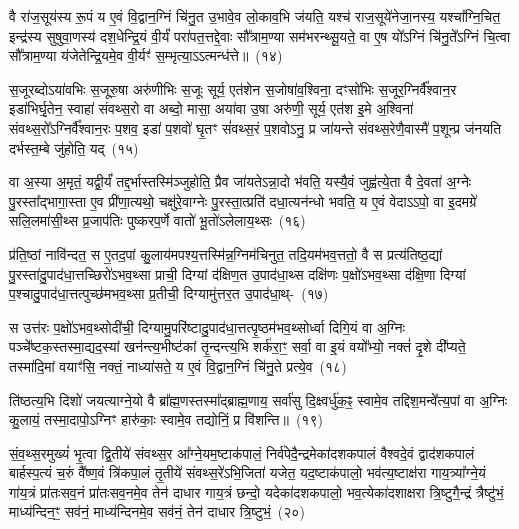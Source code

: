 वै रा॑ज॒सूय॑स्य रू॒पं य ए॒वं वि॒द्वान॒ग्निं चि॑नु॒त उ॒भावे॒व लो॒काव॒भि ज॑यति॒ यश्च॑ राज॒सूये॑नेजा॒नस्य॒ यश्चा᳚ग्नि॒चित॒ इन्द्र॑स्य सुषुवा॒णस्य॑ दश॒धेन्द्रि॒यं वी॒र्यं॑ परा॑पत॒त्तद्दे॒वाः सौ᳚त्राम॒ण्या सम॑भरन्थ्सू॒यते॒ वा ए॒ष यो᳚\-ऽग्निं चि॑नु॒ते᳚\-ऽग्निं चि॒त्वा सौ᳚त्राम॒ण्या य॑जेतेन्द्रि॒यमे॒व वी॒र्यꣳ॑ स॒म्भृत्या॒\-ऽऽत्मन्ध॑त्ते॥~(१४)\ip

{}

स॒जूरब्दो\-ऽया॑वभिः स॒जूरु॒षा अरु॑णीभिः स॒जूः सूर्य॒ एत॑शेन स॒जोषा॑व॒श्विना॒ दꣳसो॑भिः स॒जूर॒ग्निर्वै᳚श्वान॒र इडा॑भिर्घृ॒तेन॒ स्वाहा॑ संवथ्स॒रो वा अब्दो॒ मासा॒ अया॑वा उ॒षा अरु॑णी॒ सूर्य॒ एत॑श इ॒मे अ॒श्विना॑ संवथ्स॒रो᳚\-ऽग्निर्वै᳚श्वान॒रः प॒शव॒ इडा॑ प॒शवो॑ घृ॒तꣳ सं॑वथ्स॒रं प॒शवो\-ऽनु॒ प्र जा॑यन्ते संवथ्स॒रेणै॒वास्मै॑ प॒शून्प्र ज॑नयति दर्भस्त॒म्बे जु॑होति॒ यद्~(१५)\ip

वा अ॒स्या अ॒मृतं॒ यद्वी॒र्यं॑ तद्द॒र्भास्तस्मि॑ञ्जुहोति॒ प्रैव जा॑यते\-ऽन्ना॒दो भ॑वति॒ यस्यै॒वं जुह्व॑त्ये॒ता वै दे॒वता॑ अ॒ग्नेः पु॒रस्ता᳚द्भागा॒स्ता ए॒व प्री॑णा॒त्यथो॒ चक्षु॑रे॒वाग्नेः पु॒रस्ता॒त्प्रति॑ दधा॒त्यन॑न्धो भवति॒ य ए॒वं वेदाऽऽपो॒ वा इ॒दमग्रे॑ सलि॒लमा॑सी॒थ्स प्र॒जा\-प॑तिः पुष्करप॒र्णे वातो॑ भू॒तो॑\-ऽलेलाय॒थ्सः~(१६)\ip

प्र॑ति॒ष्ठां नावि॑न्दत॒ स ए॒तद॒पां कु॒लाय॑मपश्य॒त्तस्मि॑न्न॒ग्निम॑चिनुत॒ तदि॒यम॑भव॒त्ततो॒ वै स प्रत्य॑तिष्ठ॒द्यां पु॒रस्ता॑दु॒पा\-द॑धा॒त्तच्छिरो॑\-ऽभव॒थ्सा प्राची॒ दिग्यां द॑क्षिण॒त उ॒पाद॑धा॒थ्स दक्षि॑णः प॒क्षो॑\-ऽभव॒थ्सा द॑क्षि॒णा दिग्यां प॒श्चादु॒पा\-द॑धा॒त्तत्पुच्छ॑मभव॒थ्सा प्र॒तीची॒ दिग्यामु॑त्तर॒त उ॒पाद॑धा॒थ्-~(१७)\ip

स उत्त॑रः प॒क्षो॑\-ऽभव॒थ्सोदी॑ची॒ दिग्यामु॒परि॑ष्टादु॒पाद॑धा॒त्तत्पृ॒ष्ठम॑भव॒थ्सोर्ध्वा दिगि॒यं वा अ॒ग्निः पञ्चे᳚ष्टक॒स्तस्मा॒द्यद॒स्यां खन॑न्त्य॒भीष्ट॑कां तृ॒न्दन्त्य॒भि शर्क॑रा॒ꣳ॒ सर्वा॒ वा इ॒यं वयो᳚भ्यो॒ नक्तं॑ दृ॒शे दी᳚प्यते॒ तस्मा॑दि॒मां वयाꣳ॑सि॒ नक्तं॒ नाध्या॑सते॒ य ए॒वं वि॒द्वान॒ग्निं चि॑नु॒ते प्रत्ये॒व~(१८)\ip

ति॑ष्ठत्य॒भि दिशो॑ जयत्याग्ने॒यो वै ब्रा᳚ह्म॒णस्तस्मा᳚द्\-ब्राह्म॒णाय॒ सर्वा॑सु दि॒क्ष्वर्धु॑क॒ꣴ॒ स्वामे॒व तद्दिश॒मन्वे᳚त्य॒पां वा अ॒ग्निः कु॒लायं॒ तस्मा॒दापो॒\-ऽग्निꣳ हारु॑काः॒ स्वामे॒व तद्योनिं॒ प्र वि॑शन्ति॥~(१९)\ip

{\anuvakamend[{यद॑लेलाय॒थ्स उ॑त्तर॒त उ॒पाद॑धादे॒व द्वात्रिꣳ॑शच्च}]}

सं॒व॒थ्स॒रमुख्यं॑ भृ॒त्वा द्वि॒तीये॑ संवथ्स॒र आ᳚ग्ने॒यम॒ष्टा\-क॑पालं॒ निर्व॑पेदै॒न्द्रमेका॑\-दश\-कपालं वैश्वदे॒वं द्वाद॑श\-कपालं बार्\mbox{}हस्प॒त्यं च॒रुं वै᳚ष्ण॒वं त्रि॑कपा॒लं तृ॒तीये॑ संवथ्स॒रे॑\-ऽभि॒जिता॑ यजेत॒ यद॒ष्टाक॑पालो॒ भव॑त्य॒ष्टाक्ष॑रा गाय॒त्र्या᳚ग्ने॒यं गा॑य॒त्रं प्रा॑तःसव॒नं प्रा॑तःसव॒नमे॒व तेन॑ दाधार गाय॒त्रं छन्दो॒ यदेका॑\-दश\-कपालो॒ भव॒त्येका॑\-दशाक्षरा त्रि॒ष्टुगै॒न्द्रं त्रैष्टु॑भं॒ माध्य॑न्दिन॒ꣳ॒ सव॑नं॒ माध्य॑न्दिनमे॒व सव॑नं॒ तेन॑ दाधार त्रि॒ष्टुभं॒~(२०)\ip

